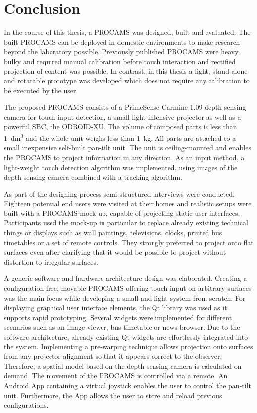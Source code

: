 \chapter{Conclusion}\label{chapter:conclusion}
In the course of this thesis, a \acl{PROCAMS} was designed, built and evaluated. The built PROCAMS can be deployed in domestic environments to make research beyond the laboratory possible. Previously published PROCAMS were heavy, bulky and required manual calibration before touch interaction and rectified projection of content was possible. In contrast, in this thesis a light, stand-alone and rotatable prototype was developed which does not require any calibration to be executed by the user.

The proposed PROCAMS consists of a PrimeSense Carmine 1.09 depth sensing camera for touch input detection, a small light-intensive projector as well as a powerful \acl{SBC}, the ODROID-XU. The volume of composed parts is less than \SI{1}{\dm\cubed} and the whole unit weighs less than \SI{1}{\kg}. All parts are attached to a small inexpensive self-built pan-tilt unit. The unit is ceiling-mounted and enables the PROCAMS to project information in any direction. As an input method, a light-weight touch detection algorithm was implemented, using images of the depth sensing camera combined with a tracking algorithm.

As part of the designing process semi-structured interviews were conducted. Eighteen potential end users were visited at their homes and realistic setups were built with a PROCAMS mock-up, capable of projecting static user interfaces. Participants used the mock-up in particular to replace already existing technical things or displays such as wall paintings, televisions, clocks, printed bus timetables or a set of remote controls. They strongly preferred to project onto flat surfaces even after clarifying that it would be possible to project without distortion to irregular surfaces.

A generic software and hardware architecture design was elaborated. Creating a configuration free, movable PROCAMS offering touch input on arbitrary surfaces was the main focus while developing a small and light system from scratch. For displaying graphical user interface elements, the Qt library was used as it supports rapid prototyping. Several widgets were implemented for different scenarios such as an image viewer, bus timetable or news browser. Due to the software architecture, already existing Qt widgets are effortlessly  integrated into the system. 
Implementing a pre-warping technique allows projection onto surfaces from any projector alignment so that it appears correct to the observer. Therefore, a spatial model based on the depth sensing camera is calculated on demand. The movement of the PROCAMS is controlled via a remote. An Android App containing a virtual joystick enables the user to control the pan-tilt unit. Furthermore, the App allows the user to store and reload previous configurations.


